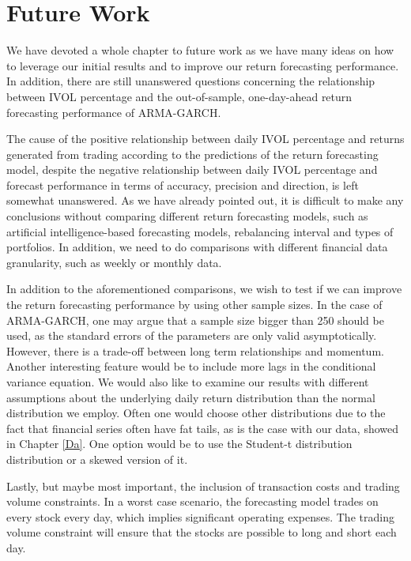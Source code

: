\chapter{Future Work} \label{FutureWork}
\label{FW}
We have devoted a whole chapter to future work as we have many ideas on how to leverage our initial results and to improve our return forecasting performance. In addition, there are still unanswered questions concerning the relationship between IVOL percentage and the out-of-sample, one-day-ahead return forecasting performance of ARMA-GARCH.

The cause of the positive relationship between daily IVOL percentage and returns generated from trading according to the predictions of the return forecasting model, despite the negative relationship between daily IVOL percentage and forecast performance in terms of accuracy, precision and direction, is left somewhat unanswered. As we have already pointed out, it is difficult to make any conclusions without comparing different return forecasting models, such as artificial intelligence-based forecasting models, rebalancing interval and types of portfolios. In addition, we need to do comparisons with different financial data granularity, such as weekly or monthly data.

In addition to the aforementioned comparisons, we wish to test if we can improve the return forecasting performance by using other sample sizes. In the case of ARMA-GARCH, one may argue that a sample size bigger than 250 should be used, as the standard errors of the parameters are only valid asymptotically. However, there is a trade-off between long term relationships and momentum. Another interesting feature would be to include more lags in the conditional variance equation. We would also like to examine our results with different assumptions about the underlying daily return distribution than the normal distribution we employ. Often one would choose other distributions due to the fact that financial series often have fat tails, as is the case with our data, showed in Chapter \ref{Da}. One option would be to use the Student-t distribution distribution or a skewed version of it.

Lastly, but maybe most important, the inclusion of transaction costs and trading volume constraints. In a worst case scenario, the forecasting model trades on every stock every day, which implies significant operating expenses. The trading volume constraint will ensure that the stocks are possible to long and short each day. 

